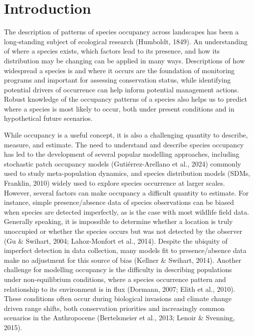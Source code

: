 \documentclass[
]{article}
\begin{document}
\section{Introduction}\label{introduction}

The description of patterns of species occupancy across landscapes has
been a long-standing subject of ecological research (Humboldt, 1849). An
understanding of where a species exists, which factors lead to its
presence, and how its distribution may be changing can be applied in
many ways. Descriptions of how widespread a species is and where it
occurs are the foundation of monitoring programs and important for
assessing conservation status, while identifying potential drivers of
occurrence can help inform potential management actions. Robust
knowledge of the occupancy patterns of a species also helps us to
predict where a species is most likely to occur, both under present
conditions and in hypothetical future scenarios.

While occupancy is a useful concept, it is also a challenging quantity
to describe, measure, and estimate. The need to understand and describe
species occupancy has led to the development of several popular
modelling approaches, including stochastic patch occupancy models
(Gutiérrez-Arellano et al., 2024) commonly used to study meta-population
dynamics, and species distribution models (SDMs, Franklin, 2010) widely
used to explore species occurrence at larger scales. However, several
factors can make occupancy a difficult quantity to estimate. For
instance, simple presence/absence data of species observations can be
biased when species are detected imperfectly, as is the case with most
wildlife field data. Generally speaking, it is impossible to determine
whether a location is truly unoccupied or whether the species occurs but
was not detected by the observer (Gu \& Swihart, 2004; Lahoz-Monfort et
al., 2014). Despite the ubiquity of imperfect detection in data
collection, many models fit to presence/absence data make no adjustment
for this source of bias (Kellner \& Swihart, 2014). Another challenge
for modelling occupancy is the difficulty in describing populations
under non-equilibrium conditions, where a species occurrence pattern and
relationship to its environment is in flux (Dormann, 2007; Elith et al.,
2010). These conditions often occur during biological invasions and
climate change driven range shifts, both conservation priorities and
increasingly common scenarios in the Anthropocene (Bertelsmeier et al.,
2013; Lenoir \& Svenning, 2015).
\end{document}
